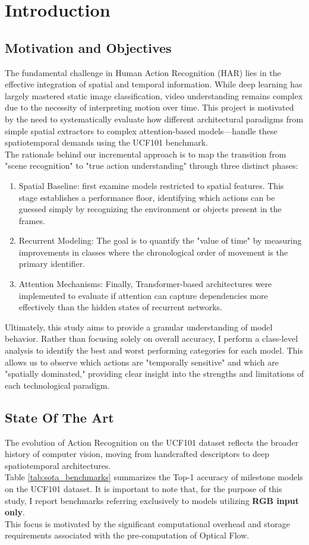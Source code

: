 \section{Introduction}


\subsection{Motivation and Objectives}
The fundamental challenge in Human Action Recognition (HAR) lies in the effective integration of spatial and temporal information. While deep learning has largely mastered static image classification, video understanding remains complex due to the necessity of interpreting motion over time. This project is motivated by the need to systematically evaluate how different architectural paradigms from simple spatial extractors to complex attention-based models—handle these spatiotemporal demands using the UCF101 benchmark.\\
The rationale behind our incremental approach is to map the transition from "scene recognition" to "true action understanding" through three distinct phases:
\begin{enumerate}
    \item Spatial Baseline: first examine models restricted to spatial features. This stage establishes a performance floor, identifying which actions can be guessed simply by recognizing the environment or objects present in the frames.
    \item Recurrent Modeling: The goal is to quantify the "value of time" by measuring improvements in classes where the chronological order of movement is the primary identifier.
    \item Attention Mechanisms: Finally, Transformer-based architectures were implemented to evaluate if attention can capture dependencies more effectively than the hidden states of recurrent networks.
\end{enumerate}
Ultimately, this study aims to provide a granular understanding of model behavior. Rather than focusing solely on overall accuracy, I perform a class-level analysis to identify the best and worst performing categories for each model. This allows us to observe which actions are "temporally sensitive" and which are "spatially dominated," providing clear insight into the strengths and limitations of each technological paradigm.


\subsection{State Of The Art}
The evolution of Action Recognition on the UCF101 dataset \cite{soomro2012ucf101} reflects the broader history of computer vision, moving from handcrafted descriptors to deep spatiotemporal architectures.\\
Table \ref{tab:sota_benchmarks} summarizes the Top-1 accuracy of milestone models on the UCF101 dataset. It is important to note that, for the purpose of this study, I report benchmarks referring exclusively to models utilizing \textbf{RGB input only}.\\
This focus is motivated by the significant computational overhead and storage requirements associated with the pre-computation of Optical Flow.

